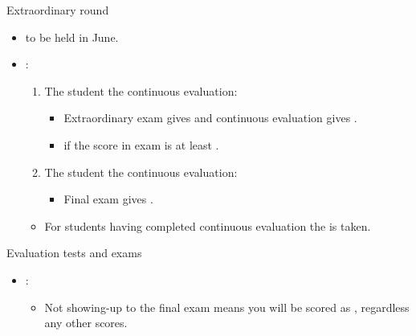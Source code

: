 \begin{frame}[t]{Extraordinary round}
\begin{itemize}
  \item {} to be held in June.

  \item {}:
    \begin{enumerate}
      \item The student  the continuous evaluation:
        \begin{itemize}
          \item Extraordinary exam gives  
                and continuous evaluation gives .
          \item {} if the score in exam is at least .
        \end{itemize}
      \item The student  the continuous evaluation: 
        \begin{itemize}
          \item Final exam gives .
        \end{itemize}
    \end{enumerate}

    \begin{itemize}
      \item For students having completed continuous evaluation 
            the  is taken.
    \end{itemize}
\end{itemize}
\end{frame}

\begin{frame}[t]{Evaluation tests and exams}
\begin{itemize}
  \item {}:
    \begin{itemize}
      \item Not showing-up to the final exam means you will be scored 
            as , 
            regardless any other scores.
    \end{itemize}
\end{itemize}
\end{frame}
